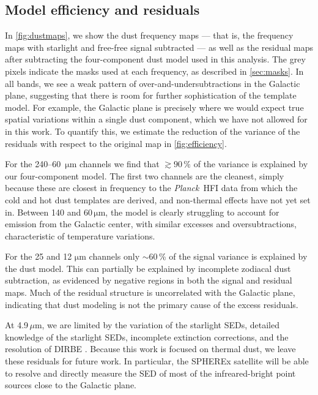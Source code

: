 \documentclass{aa}
\def\Planck{\textit{Planck}}
\begin{document}
\subsection{Model efficiency and residuals}

In \cref{fig:dustmaps}, we show the dust frequency maps --- that is,
the frequency maps with starlight and free-free signal subtracted ---
as well as the residual maps after subtracting the four-component dust
model used in this analysis. The grey pixels indicate the masks used
at each frequency, as described in \cref{sec:masks}. In all bands, we
see a weak pattern of over-and-undersubtractions in the Galactic
plane, suggesting that there is room for further sophistication of the
template model.  For example, the Galactic plane is precisely where we
would expect true spatial variations within a single dust component,
which we have not allowed for in this work. To quantify this, we
estimate the reduction of the variance of the residuals with respect to
the original map in \cref{fig:efficiency}.

For the 240--60 $\,\mathrm{\mu m}$ channels we find that
$\gtrsim90\,\%$ of the variance is explained by our four-component
model. The first two channels are the cleanest, simply because these
are closest in frequency to the \Planck\ HFI data from which the cold
and hot dust templates are derived, and non-thermal effects have not
yet set in. Between 140 and 60\,$\mathrm{\mu m}$, the model is
clearly struggling to account for emission from the Galactic center,
with similar excesses and oversubtractions, characteristic of
temperature variations.

For the 25 and 12 $\mathrm{\mu m}$ channels only $\sim$60\,\% of the
signal variance is explained by the dust model. This can partially be
explained by incomplete zodiacal dust subtraction, as evidenced by
negative regions in both the signal and residual maps. Much of the
residual structure is uncorrelated with the Galactic plane, indicating
that dust modeling is not the primary cause of the excess residuals.

At 4.9\,$\mu$m, we are limited by the variation of the starlight SEDs,
detailed knowledge of the starlight SEDs, incomplete extinction
corrections, and the resolution of DIRBE \citep{CG02_04}. Because this
work is focused on thermal dust, we leave these residuals for future
work. In particular, the SPHEREx \citep{dore:2014} satellite will be able to resolve and
directly measure the SED of most of the infreared-bright point sources
close to the Galactic plane.
\end{document}
